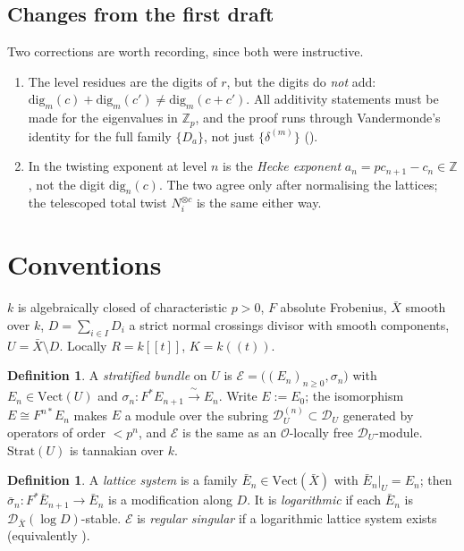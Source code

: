 \documentclass[11pt,reqno]{amsart}
\newcommand{\Zp}{\mathbb{Z}_p}
\newcommand{\ZZ}{\mathbb{Z}}
\newcommand{\cO}{\mathcal{O}}
\newcommand{\cD}{\mathcal{D}}
\newcommand{\cE}{\mathcal{E}}
\newcommand{\Strat}{\mathrm{Strat}}
\newcommand{\Vect}{\mathrm{Vect}}
\newcommand{\dig}{\mathrm{dig}}
\newcommand{\isoto}{\xrightarrow{\ \sim\ }}
\theoremstyle{plain}
\theoremstyle{definition}
\newtheorem{definition}[theorem]{Definition}
\theoremstyle{remark}
\numberwithin{equation}{section}
\begin{document}
\subsection{Changes from the first draft}
Two corrections are worth recording, since both were instructive.
\begin{enumerate}
\item The level residues are the digits of $r$, but the digits do
      \emph{not} add: $\dig_m(c)+\dig_m(c')\ne\dig_m(c+c')$.  All
      additivity statements must be made for the eigenvalues in $\Zp$, and
      the proof runs through Vandermonde's identity for the full family
      $\{D_a\}$, not just $\{\delta^{(m)}\}$ ().
\item In  the twisting exponent at level $n$ is the
      \emph{Hecke exponent} $a_n=pc_{n+1}-c_n\in\ZZ$, not the digit
      $\dig_n(c)$.  The two agree only after normalising the lattices;
      the telescoped total twist $N_i^{\otimes c}$ is the same either way.
\end{enumerate}

\section{Conventions}\label{sec:conventions}

$k$ is algebraically closed of characteristic $p>0$, $F$ absolute
Frobenius, $\bar X$ smooth over $k$, $D=\sum_{i\in I}D_i$ a strict normal
crossings divisor with smooth components, $U=\bar X\setminus D$.  Locally
$R=k[[t]]$, $K=k((t))$.

\begin{definition}
A \emph{stratified bundle} on $U$ is
$\cE=\bigl((E_n)_{n\ge0},\sigma_n\bigr)$ with $E_n\in\Vect(U)$ and
$\sigma_n\colon F^*E_{n+1}\isoto E_n$.  Write $E:=E_0$; the isomorphism
$E\cong F^{n*}E_n$ makes $E$ a module over the subring
$\cD_U^{(n)}\subset\cD_U$ generated by operators of order $<p^n$, and
$\cE$ is the same as an $\cO$-locally free $\cD_U$-module.  $\Strat(U)$ is
tannakian over $k$.
\end{definition}

\begin{definition}\label{def:lattice}
A \emph{lattice system} is a family $\bar E_n\in\Vect(\bar X)$ with
$\bar E_n|_U=E_n$; then
$\bar\sigma_n\colon F^*\bar E_{n+1}\to\bar E_n$ is a modification along
$D$.  It is \emph{logarithmic} if each $\bar E_n$ is
$\cD_{\bar X}(\log D)$-stable.  $\cE$ is \emph{regular singular} if a
logarithmic lattice system exists (equivalently \cite{Kindler}).
\end{definition}
\end{document}
